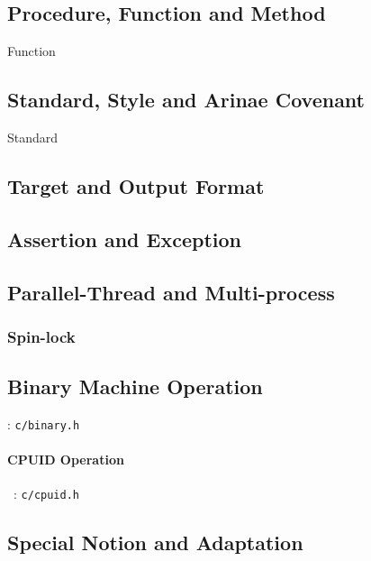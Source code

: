 \subsection{Procedure, Function and Method}
{Function}

\subsection{Standard, Style and Arinae Covenant}
{Standard}

\subsection{Target and Output Format}



\subsection{Assertion and Exception}


\subsection{Parallel-Thread and Multi-process}

\subsubsection{Spin-lock}

\subsection{Binary Machine Operation}
: \verb`c/binary.h`

\paragraph{CPUID Operation} \
: \verb`c/cpuid.h`


\subsection{Special Notion and Adaptation}







